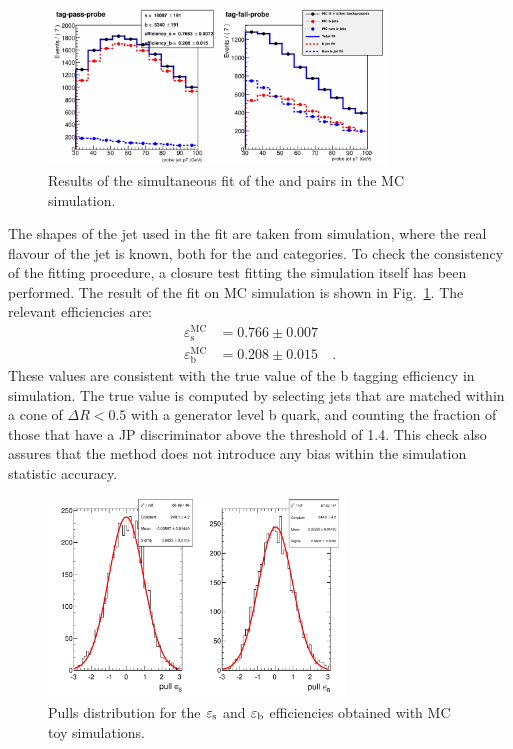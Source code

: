 \begin{figure}[!htb]
\centering
\includegraphics[width=0.8\textwidth]{images/mc_pt_probe-v2.pdf}
\caption{Results of the simultaneous fit of the \tpp and \tfp pairs in the MC simulation.\label{fig:mc_tp}}
\end{figure}

The \pt shapes of the \probe jet used in the fit are taken from simulation, where the real flavour of the jet is known, both for the \tpp and \tfp categories. To check the consistency of the fitting procedure, a closure test fitting the simulation itself has been performed.
The result of the fit on MC simulation is shown in Fig.~\ref{fig:mc_tp}. The relevant efficiencies are:
\begin{equation}
\begin{split}
\varepsilon_\mathrm{s}^\mathrm{MC} &= 0.766\pm0.007 \\
\varepsilon_\mathrm{b}^\mathrm{MC} &= 0.208\pm0.015 \quad .
\end{split}
\end{equation}
These values are consistent with the true value of the b tagging efficiency in simulation. The true value is computed by selecting jets that are matched within a cone of $\Delta{R}<0.5$ with a generator level b quark, and counting the fraction of those that have a JP discriminator above the threshold of 1.4. This check also assures that the \tp method does not introduce any bias within the simulation statistic accuracy.

\begin{figure}[htb]
\centering
\includegraphics[width=0.7\textwidth]{images/pulls_mc.pdf}
\caption{Pulls distribution for the $\varepsilon_{\rm s}$ and $\varepsilon_{\rm b}$ efficiencies obtained with MC toy simulations.\label{fig:pullstp}}
\end{figure}

